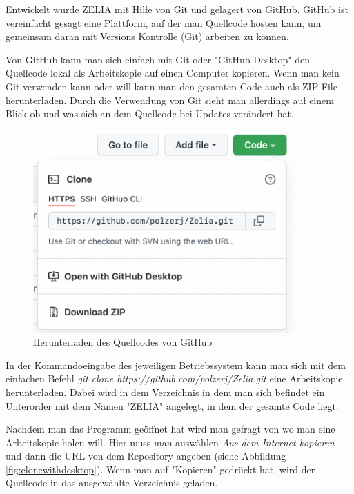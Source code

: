 
Entwickelt wurde ZELIA mit Hilfe von Git und gelagert von GitHub. GitHub ist vereinfacht gesagt eine Plattform, auf der man Quellcode hosten kann, um gemeinsam daran mit Versions Kontrolle (Git) arbeiten zu können. 

Von GitHub kann man sich einfach mit Git oder "GitHub Desktop" den Quellcode lokal als Arbeitskopie auf einen Computer kopieren. Wenn man kein Git verwenden kann oder will kann man den gesamten Code auch als ZIP-File herunterladen. Durch die Verwendung von Git sieht man allerdings auf einem Blick ob und was sich an dem Quellcode bei Updates verändert hat.

\begin{figure}[H]
    \centering
    \includegraphics[width=100mm]{media/Handbuch/GitHub_Download.png}
    \caption{Herunterladen des Quellcodes von GitHub}
\end{figure}


In der Kommandoeingabe des jeweiligen Betriebssystem kann man sich mit dem einfachen Befehl \emph{git clone https://github.com/polzerj/Zelia.git} eine Arbeitskopie herunterladen. Dabei wird in dem Verzeichnis in dem man sich befindet ein Unterorder mit dem Namen "ZELIA" angelegt, in dem der gesamte Code liegt.


Nachdem man das Programm geöffnet hat wird man gefragt von wo man eine Arbeitskopie holen will. Hier muss man auswählen \emph{Aus dem Internet kopieren} und dann die URL von dem Repository angeben (siehe Abbildung \ref{fig:clonewithdesktop}). Wenn man auf "Kopieren" gedrückt hat, wird der Quellcode in das ausgewählte Verzeichnis geladen. 

